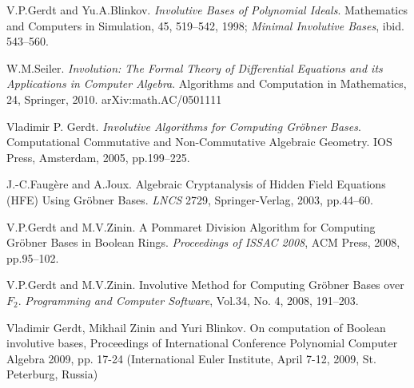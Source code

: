 \documentclass[12pt]{article}
\newcommand{\Gr}{Gr\"obner }
\begin{document}
\begin{thebibliography}{99}

 V.P.Gerdt and Yu.A.Blinkov. {\em Involutive Bases of Polynomial Ideals}. 
Mathematics and Computers in Simulation, 45, 519--542, 1998; {\em Minimal Involutive Bases}, ibid. 543--560.
 
 W.M.Seiler. {\em Involution: The Formal Theory of Differential Equations and its Applications 
in Computer Algebra}. Algorithms and Computation in Mathematics, 24, Springer, 2010.  arXiv:math.AC/0501111

 Vladimir P. Gerdt. {\em Involutive Algorithms for Computing \Gr Bases}.
Computational Commutative and Non-Commutative Algebraic Geometry. IOS Press, Amsterdam, 2005, pp.199--225.

J.-C.Faug\`{e}re and A.Joux. Algebraic Cryptanalysis of Hidden Field Equations
(HFE) Using \Gr Bases. {\em LNCS} 2729, Springer-Verlag, 2003, pp.44--60.

V.P.Gerdt and M.V.Zinin. A Pommaret Division Algorithm for Computing \Gr Bases in Boolean Rings.
{\em Proceedings of ISSAC 2008}, ACM Press, 2008, pp.95--102.

V.P.Gerdt and M.V.Zinin. Involutive Method for Computing \Gr Bases over $F_2$.
{\em Programming and Computer Software}, Vol.34, No. 4, 2008, 191--203.

Vladimir Gerdt, Mikhail Zinin and Yuri Blinkov. On computation of Boolean involutive bases,
Proceedings of International Conference Polynomial Computer Algebra 2009, pp. 17-24
(International Euler Institute, April 7-12, 2009, St. Peterburg, Russia)


\end{thebibliography}
\end{document}
